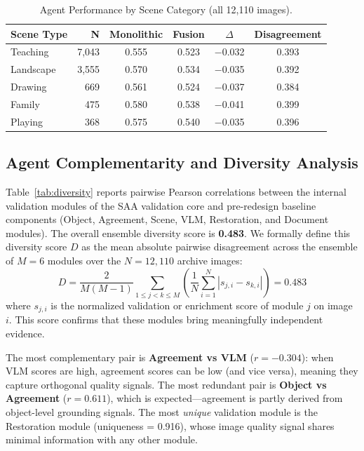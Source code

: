 \documentclass[12pt,onecolumn,a4paper]{IEEEtran}
\begin{document}
\begin{table}[!htbp]
\centering
\caption{Agent Performance by Scene Category (all 12,110 images).}
\label{tab:scene_perf}
\begin{tabular}{lrcccc}
\toprule
Scene Type & N & Monolithic & Fusion & $\Delta$ & Disagreement \\
\midrule
Teaching  & 7,043 & 0.555 & 0.523 & $-$0.032 & 0.393 \\
Landscape & 3,555 & 0.570 & 0.534 & $-$0.035 & 0.392 \\
Drawing   &   669 & 0.561 & 0.524 & $-$0.037 & 0.384 \\
Family    &   475 & 0.580 & 0.538 & $-$0.041 & 0.399 \\
Playing   &   368 & 0.575 & 0.540 & $-$0.035 & 0.396 \\
\bottomrule
\end{tabular}
\end{table}

\subsection{Agent Complementarity and Diversity Analysis}
\label{sec:diversity}

Table~\ref{tab:diversity} reports pairwise Pearson correlations between the internal validation modules of the SAA validation core and pre-redesign baseline components (Object, Agreement, Scene, VLM, Restoration, and Document modules). The overall ensemble diversity score is \textbf{0.483}. We formally define this diversity score $D$ as the mean absolute pairwise disagreement across the ensemble of $M = 6$ modules over the $N = 12{,}110$ archive images:
\begin{equation}
  D = \frac{2}{M(M-1)} \sum_{1 \le j < k \le M} \left( \frac{1}{N} \sum_{i=1}^N |s_{j, i} - s_{k, i}| \right) = 0.483
\end{equation}
where $s_{j,i}$ is the normalized validation or enrichment score of module $j$ on image $i$. This score confirms that these modules bring meaningfully independent evidence.

The most complementary pair is \textbf{Agreement vs VLM} ($r = -0.304$): when VLM scores are high, agreement scores can be low (and vice versa), meaning they capture orthogonal quality signals. The most redundant pair is \textbf{Object vs Agreement} ($r = 0.611$), which is expected---agreement is partly derived from object-level grounding signals. The most \textit{unique} validation module is the Restoration module (uniqueness = 0.916), whose image quality signal shares minimal information with any other module. 
\end{document}
